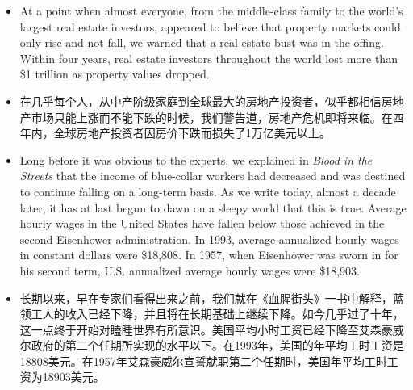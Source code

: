 
\begin{itemize}
\item At a point when almost everyone, from the middle-class family to the world's largest real estate investors, appeared to believe that property markets could only rise and not fall, we warned that a real estate bust was in the offing. Within four years, real estate investors throughout the world lost more than \$1 trillion as property values dropped. 
\item \small 在几乎每个人，从中产阶级家庭到全球最大的房地产投资者，似乎都相信房地产市场只能上涨而不能下跌的时候，我们警告道，房地产危机即将来临。在四年内，全球房地产投资者因房价下跌而损失了1万亿美元以上。
\end{itemize}


\begin{itemize}
\item Long before it was obvious to the experts, we explained in \emph{Blood in the Streets} that the income of blue-collar workers had decreased and was destined to continue falling on a long-term basis. As we write today, almost a decade later, it has at last begun to dawn on a sleepy world that this is true. Average hourly wages in the United States have fallen below those achieved in the second Eisenhower administration. In 1993, average annualized hourly wages in constant dollars were \$18,808. In 1957, when Eisenhower was sworn in for his second term, U.S. annualized average hourly wages were \$18,903.
\item \small 长期以来，早在专家们看得出来之前，我们就在《血腥街头》一书中解释，蓝领工人的收入已经下降，并且将在长期基础上继续下降。如今几乎过了十年，这一点终于开始对瞌睡世界有所意识。美国平均小时工资已经下降至艾森豪威尔政府的第二个任期所实现的水平以下。在1993年，美国的年平均工时工资是18808美元。在1957年艾森豪威尔宣誓就职第二个任期时，美国年平均工时工资为18903美元。 
\end{itemize}


